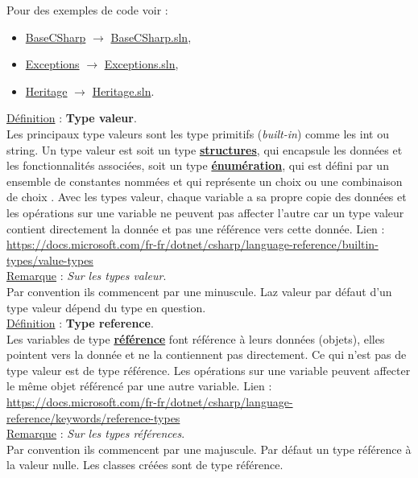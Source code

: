 \documentclass[a4paper,12pt,twoside]{article}
\newcommand{\exemplepath}{../Exercices}
\newcommand{\urlcolor}{magenta}  %
\newcommand{\foldercolor}{orange} %
\newcommand{\slncolor}{violet} %
\newcommand{\keycolor}{purple} %
\newcommand{\incode}[1]{{\footnotesize\ttfamily #1}} %
\newcommand{\rem}[2]{\noindent\underline{Remarque} : \textit{#1}.\\ \indent #2}
\newcommand{\defi}[2]{\noindent\underline{Définition} : \textbf{#1}.\\ \indent #2}
\newcommand{\slnref}[2]{\hypersetup{urlcolor=\slncolor}\href{file:\exemplepath /#1.sln}{#2.sln}\hypersetup{urlcolor=\urlcolor}}
\newcommand{\folderref}[2]{\hypersetup{urlcolor=\foldercolor}\href{file:\exemplepath /#1/.}{#2}\hypersetup{urlcolor=\urlcolor}}
\newcommand{\keyref}[2]{\hypersetup{urlcolor=\keycolor} \href{#1}{\textbf{#2}}\hypersetup{urlcolor=\urlcolor}}
\begin{document}
Pour des exemples de code voir : 
\begin{itemize}
 \item \folderref{BasesCSharp}{BaseCSharp} $\to$ \slnref{BasesCSharp/BasesCSharp}{BaseCSharp}, 
 \item \folderref{Exceptions}{Exceptions} $\to$ \slnref{Exceptions/Exceptions}{Exceptions}, 
 \item \folderref{Heritage}{Heritage} $\to$ \slnref{Heritage/Heritage}{Heritage}.\\
\end{itemize}

\defi{Type valeur}{Les principaux type valeurs sont les type primitifs (\textit{built-in}) comme les \incode{int} ou \incode{string}. Un type valeur est soit un type \keyref{https://docs.microsoft.com/fr-fr/dotnet/csharp/language-reference/builtin-types/struct}{structures}, qui encapsule les données et les fonctionnalités associées, soit un type \keyref{https://docs.microsoft.com/fr-fr/dotnet/csharp/language-reference/builtin-types/enum}{énumération}, qui est défini par un ensemble de constantes nommées et qui représente un choix ou une combinaison de choix . Avec les types valeur, chaque variable a sa propre copie des données et les opérations sur une variable ne peuvent pas affecter l’autre car un type valeur contient directement la donnée et pas une référence vers cette donnée. 
Lien : \url{https://docs.microsoft.com/fr-fr/dotnet/csharp/language-reference/builtin-types/value-types}}\\

\rem{Sur les types valeur}{Par convention ils commencent par une minuscule. Laz valeur par défaut d'un type valeur dépend du type en question.}\\

\defi{Type reference}{Les variables de type \keyref{https://docs.microsoft.com/fr-fr/dotnet/csharp/language-reference/keywords/reference-types}{référence} font référence à leurs données (objets), elles pointent vers la donnée et ne la contiennent pas directement. Ce qui n'est pas de type valeur est de type référence. Les opérations sur une variable peuvent affecter le même objet référencé par une autre variable. Lien : \url{https://docs.microsoft.com/fr-fr/dotnet/csharp/language-reference/keywords/reference-types}}\\

\rem{Sur les types références}{Par convention ils commencent par une majuscule. Par défaut un type référence à la valeur nulle. Les classes créées sont de type référence.}\\
\end{document}
